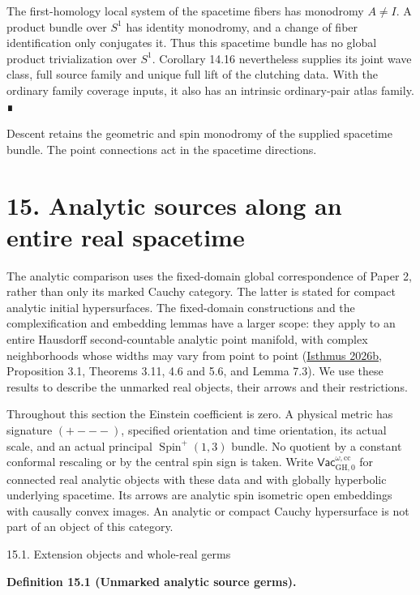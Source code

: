 \documentclass[
  english,
  11pt,
  reqno]{amsart}
\makeatletter
\newcommand{\paperstatementsection}{\@startsection{subsection}{2}%
  \z@{.5\linespacing\@plus.7\linespacing}{.35\baselineskip}%
  {\normalfont\bfseries}}
\newcommand{\paperfirststatement}[1]{%
  {\normalfont\bfseries #1\par}%
  \nobreak\@afterindenttrue\@afterheading}
\makeatother
\begin{document}
The first-homology local system of the spacetime fibers has monodromy
\(A\ne I\). A product bundle over \(S^1\) has identity monodromy, and a
change of fiber identification only conjugates it. Thus this spacetime
bundle has no global product trivialization over \(S^1\). Corollary
14.16 nevertheless supplies its joint wave class, full source family and
unique full lift of the clutching data. With the ordinary family
coverage inputs, it also has an intrinsic ordinary-pair atlas family. ∎

Descent retains the geometric and spin monodromy of the supplied
spacetime bundle. The point connections act in the spacetime directions.

\protect{}\label{sec:global-analytic-real-germs}

\section{15. Analytic sources along an entire real
spacetime}\label{analytic-sources-along-an-entire-real-spacetime}

The analytic comparison uses the fixed-domain global correspondence of
Paper 2, rather than only its marked Cauchy category. The latter is
stated for compact analytic initial hypersurfaces. The fixed-domain
constructions and the complexification and embedding lemmas have a
larger scope: they apply to an entire Hausdorff second-countable
analytic point manifold, with complex neighborhoods whose widths may
vary from point to point (\hyperref[ref-IsthmusGlobal2026]{Isthmus
2026b}, Proposition 3.1, Theorems 3.11, 4.6 and 5.6, and Lemma 7.3). We
use these results to describe the unmarked real objects, their arrows
and their restrictions.

Throughout this section the Einstein coefficient is zero. A physical
metric has signature \((+---)\), specified orientation and time
orientation, its actual scale, and an actual principal
\(\operatorname{Spin}^{+}(1,3)\) bundle. No quotient by a constant
conformal rescaling or by the central spin sign is taken. Write
\(\mathsf{Vac}^{\omega,\mathrm{cc}}_{\mathrm{GH},0}\) for connected real
analytic objects with these data and with globally hyperbolic underlying
spacetime. Its arrows are analytic spin isometric open embeddings with
causally convex images. An analytic or compact Cauchy hypersurface is
not part of an object of this category.

\protect{}\label{sec:unmarked-analytic-source-category}
\paperstatementsection{15.1. Extension objects and whole-real
germs}\label{extension-objects-and-whole-real-germs}
\paperfirststatement{\protect{}\label{def:unmarked-analytic-source-germs}Definition 15.1 (Unmarked analytic source germs).}
\end{document}
